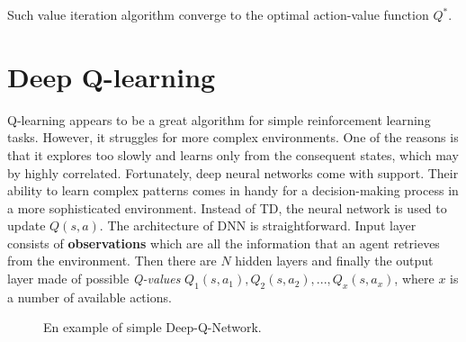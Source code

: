 Such value iteration algorithm converge to the optimal action-value function $Q^*$.

\section{Deep Q-learning}
\label{sec:deep-q-learn}

Q-learning appears to be a great algorithm for simple reinforcement learning tasks. However, it struggles for more complex
environments. One of the reasons is that it explores too slowly and learns only from the consequent states, which may by highly
correlated. Fortunately, deep neural networks come with support. Their ability to learn complex patterns comes in handy for a
decision-making process in a more sophisticated environment. Instead of TD, the neural network is used to update $Q(s, a)$. The
architecture of DNN is straightforward. Input layer consists of \textbf{observations} which are all the information that an agent
retrieves from the environment. Then there are $N$ hidden layers and finally the output layer made of possible \emph{Q-values} $Q_1(s, a_1),
Q_2(s, a_2), ..., Q_x(s, a_x)$, where $x$ is a number of available actions.

\vspace{1cm}

\begin{figure}[h]
\centering
{}
\caption{En example of simple Deep-Q-Network.}
\label{fig:deep-q-network}
\end{figure}

